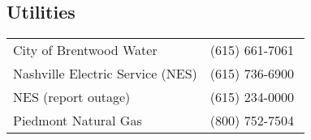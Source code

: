 \subsection{Utilities}

\begin{tabular}{ll}
	City of Brentwood Water & (615) 661-7061 \\
	Nashville Electric Service (NES) & (615) 736-6900 \\
	NES (report outage) & (615) 234-0000 \\
	Piedmont Natural Gas & (800) 752-7504 \\
\end{tabular}

